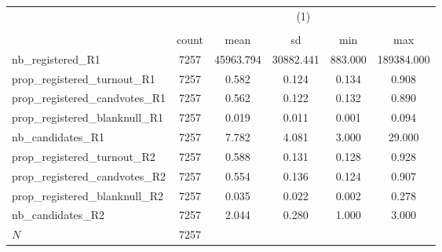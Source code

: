 {
\def\sym#1{\ifmmode^{#1}\else\(^{#1}\)\fi}
\begin{tabular}{l*{1}{ccccc}}
\hline\hline
            &\multicolumn{5}{c}{(1)}                                         \\
            &\multicolumn{5}{c}{}                                            \\
            &       count&        mean&          sd&         min&         max\\
\hline
nb\_registered\_R1&        7257&   45963.794&   30882.441&     883.000&  189384.000\\
prop\_registered\_turnout\_R1&        7257&       0.582&       0.124&       0.134&       0.908\\
prop\_registered\_candvotes\_R1&        7257&       0.562&       0.122&       0.132&       0.890\\
prop\_registered\_blanknull\_R1&        7257&       0.019&       0.011&       0.001&       0.094\\
nb\_candidates\_R1&        7257&       7.782&       4.081&       3.000&      29.000\\
prop\_registered\_turnout\_R2&        7257&       0.588&       0.131&       0.128&       0.928\\
prop\_registered\_candvotes\_R2&        7257&       0.554&       0.136&       0.124&       0.907\\
prop\_registered\_blanknull\_R2&        7257&       0.035&       0.022&       0.002&       0.278\\
nb\_candidates\_R2&        7257&       2.044&       0.280&       1.000&       3.000\\
\hline
\(N\)       &        7257&            &            &            &            \\
\hline\hline
\end{tabular}
}
